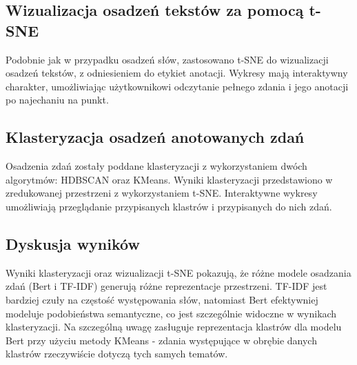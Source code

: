 \documentclass[12pt]{article}
\begin{document}
\subsection{Wizualizacja osadzeń tekstów za pomocą t-SNE}
Podobnie jak w przypadku osadzeń słów, zastosowano t-SNE do wizualizacji osadzeń tekstów, z odniesieniem do etykiet anotacji. Wykresy mają interaktywny charakter, umożliwiając użytkownikowi odczytanie pełnego zdania i jego anotacji po najechaniu na punkt.

\subsection{Klasteryzacja osadzeń anotowanych zdań}
Osadzenia zdań zostały poddane klasteryzacji z wykorzystaniem dwóch algorytmów: HDBSCAN oraz KMeans. Wyniki klasteryzacji przedstawiono w zredukowanej przestrzeni z wykorzystaniem t-SNE. Interaktywne wykresy umożliwiają przeglądanie przypisanych klastrów i przypisanych do nich zdań.

\subsection{Dyskusja wyników}
Wyniki klasteryzacji oraz wizualizacji t-SNE pokazują, że różne modele osadzania zdań (Bert i TF-IDF) generują różne reprezentacje przestrzeni. TF-IDF jest bardziej czuły na częstość występowania słów, natomiast Bert efektywniej modeluje podobieństwa semantyczne, co jest szczególnie widoczne w wynikach klasteryzacji. Na szczególną uwagę zasługuje reprezentacja klastrów dla modelu Bert przy użyciu metody KMeans - zdania występujące w obrębie danych klastrów rzeczywiście dotyczą tych samych tematów.
\end{document}
